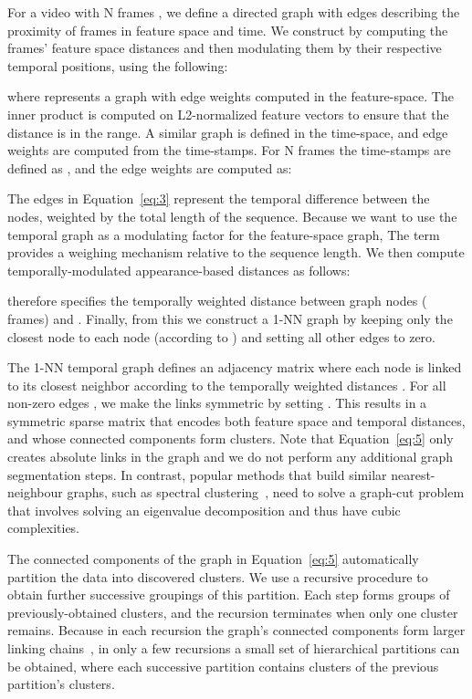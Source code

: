 \documentclass[10pt,twocolumn,letterpaper]{article}
\begin{document}
For a video with N frames , we define a directed graph  with edges describing the proximity of frames in feature space and time. We construct  by computing the frames' feature space distances and then modulating them by their respective temporal positions, using the following: 



where  represents a graph with edge weights computed in the feature-space. The inner product is computed on L2-normalized feature vectors to ensure that the distance is in the  range. A similar graph  is defined in the time-space, and edge weights are computed from the time-stamps. For N frames the time-stamps are defined as , and the edge weights are computed as:

The edges in Equation~\ref{eq:3} represent the temporal difference between the nodes, weighted by the total length of the sequence. Because we want to use the temporal graph as a modulating factor for the feature-space graph, The term   provides a
weighing mechanism relative to the sequence length. We then compute temporally-modulated appearance-based distances as follows:


 therefore specifies the temporally weighted distance between graph nodes ( frames)  and . Finally, from this we construct a 1-NN graph by keeping only the closest node to each node (according to ) and setting all other edges to zero. 



The 1-NN temporal graph  defines an adjacency matrix where each node is linked to its closest neighbor according to the temporally weighted distances . For all non-zero edges , we make the links symmetric by setting .
This results in a symmetric sparse matrix that encodes both feature space and temporal distances, and whose connected components form clusters.
Note that Equation~\ref{eq:5} only creates absolute links in the graph and we do not perform any additional graph segmentation steps. In contrast, popular methods that build similar nearest-neighbour graphs, such as spectral clustering~\cite{von2007tutorial}, need to solve a graph-cut problem that involves solving an eigenvalue decomposition and thus have cubic complexities.

The connected components of the graph in Equation~\ref{eq:5} automatically partition the data into discovered clusters.
We use a recursive procedure to obtain further successive groupings of this partition.
Each step forms groups of previously-obtained clusters, and the recursion terminates when only one cluster remains.
Because in each recursion the graph's connected components form larger linking chains~\cite{finch}, in only a few recursions a small set of hierarchical partitions can be obtained, where each successive partition contains clusters of the previous partition's clusters.
\end{document}
